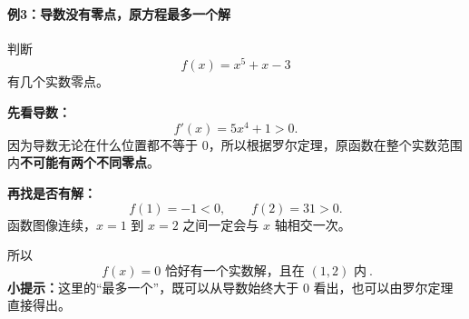 \clearpage
\begin{examplebox}
\par\medskip
\noindent\begin{minipage}{\linewidth}
\paragraph{例3：导数没有零点，原方程最多一个解}
\begin{center}\end{center}
\end{minipage}\par\medskip

判断
\[
f(x)=x^5+x-3
\]
有几个实数零点。

\textbf{先看导数：}
\[
f'(x)=5x^4+1>0.
\]
因为导数无论在什么位置都不等于 $0$，所以根据罗尔定理，原函数在整个实数范围内\textbf{不可能有两个不同零点}。

\textbf{再找是否有解：}
\[
f(1)=-1<0,\qquad f(2)=31>0.
\]
函数图像连续，$x=1$ 到 $x=2$ 之间一定会与 $x$ 轴相交一次。

所以
\[
\boxed{\ f(x)=0\text{ 恰好有一个实数解，且在 }(1,2)\text{ 内}\ }.
\]
\textbf{小提示：}这里的“最多一个”，既可以从导数始终大于 $0$ 看出，也可以由罗尔定理直接得出。

\end{examplebox}
\clearpage
